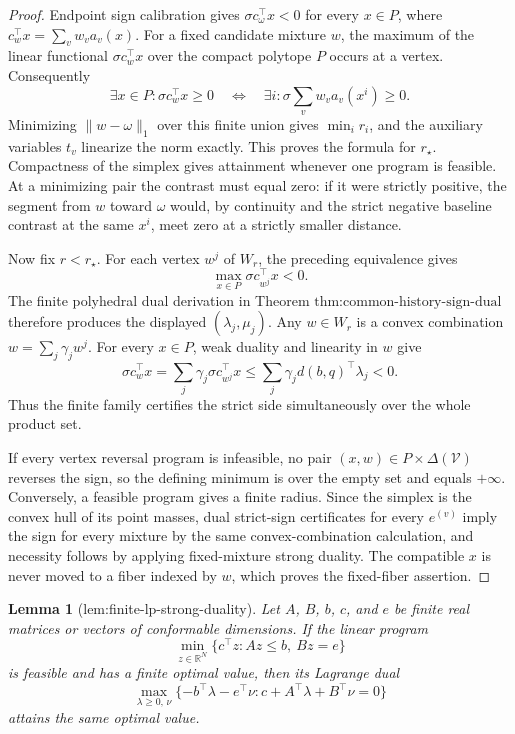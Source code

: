 \documentclass{article}
\newtheorem{lemma}{Lemma}
\begin{document}
\begin{proof}
Endpoint sign calibration gives \(\sigma c_\omega^\top x<0\) for every \(x\in P\), where \(c_w^\top x=\sum_vw_va_v(x)\).  For a fixed candidate mixture \(w\), the maximum of the linear functional \(\sigma c_w^\top x\) over the compact polytope \(P\) occurs at a vertex.  Consequently
\[
\exists x\in P:\sigma c_w^\top x\geq0
\quad\Longleftrightarrow\quad
\exists i:\sigma\sum_vw_va_v(x^i)\geq0.
\]
Minimizing \(\lVert w-\omega\rVert_1\) over this finite union gives \(\min_i r_i\), and the auxiliary variables \(t_v\) linearize the norm exactly.  This proves the formula for \(r_\star\).  Compactness of the simplex gives attainment whenever one program is feasible.  At a minimizing pair the contrast must equal zero: if it were strictly positive, the segment from \(w\) toward \(\omega\) would, by continuity and the strict negative baseline contrast at the same \(x^i\), meet zero at a strictly smaller distance.

Now fix \(r<r_\star\).  For each vertex \(w^j\) of \(W_r\), the preceding equivalence gives
\[
\max_{x\in P}\sigma c_{w^j}^\top x<0.
\]
The finite polyhedral dual derivation in Theorem \(\text{thm:common-history-sign-dual}\) therefore produces the displayed \((\lambda_j,\mu_j)\).  Any \(w\in W_r\) is a convex combination \(w=\sum_j\gamma_jw^j\).  For every \(x\in P\), weak duality and linearity in \(w\) give
\[
\sigma c_w^\top x
=\sum_j\gamma_j\sigma c_{w^j}^\top x
\leq\sum_j\gamma_jd(b,q)^\top\lambda_j<0.
\]
Thus the finite family certifies the strict side simultaneously over the whole product set.

If every vertex reversal program is infeasible, no pair \((x,w)\in P\times\Delta(\mathcal V)\) reverses the sign, so the defining minimum is over the empty set and equals \(+\infty\).  Conversely, a feasible program gives a finite radius.  Since the simplex is the convex hull of its point masses, dual strict-sign certificates for every \(e^{(v)}\) imply the sign for every mixture by the same convex-combination calculation, and necessity follows by applying fixed-mixture strong duality.  The compatible \(x\) is never moved to a fiber indexed by \(w\), which proves the fixed-fiber assertion.
\end{proof}

\begin{lemma}[lem:finite-lp-strong-duality]\label{lem:finite-lp-strong-duality}
Let \(A\), \(B\), \(b\), \(c\), and \(e\) be finite real matrices or vectors of conformable dimensions.  If the linear program
\[
 \min_{z\in\mathbb R^N}\{c^\top z:Az\leq b,\ Bz=e\}
\]
is feasible and has a finite optimal value, then its Lagrange dual
\[
 \max_{\lambda\geq0,\,\nu}\{-b^\top\lambda-e^\top\nu:
 c+A^\top\lambda+B^\top\nu=0\}
\]
attains the same optimal value.
\end{lemma}
\end{document}
